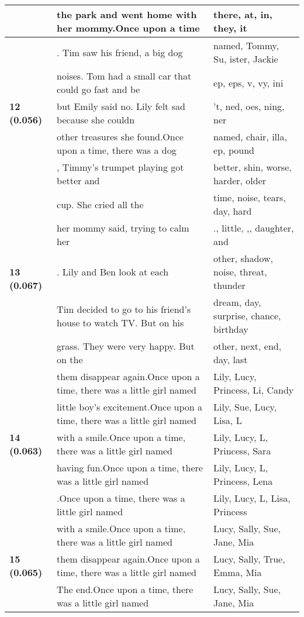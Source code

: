 \documentclass{article}
\begin{document}
\begin{adjustbox}{max width=\textwidth}
\begin{tabular}{p{} p{} p{}}
 & the park and went home with her mommy.Once upon a time & there,  at,  in,  they,  it \\
\midrule
\multirow{5}{*}{\textbf{12 (0.056)}} & . Tim saw his friend, a big dog & named,  Tommy,  Su, ister,  Jackie \\
 & noises. Tom had a small car that could go fast and be & ep, eps, v, vy, ini \\
 & but Emily said no. Lily felt sad because she couldn & 't, ned, oes, ning, ner \\
 & other treasures she found.Once upon a time, there was a dog & named, chair, illa, ep,  pound \\
 & , Timmy's trumpet playing got better and & better,  shin,  worse,  harder,  older \\
\midrule
\multirow{5}{*}{\textbf{13 (0.067)}} & cup. She cried all the & time,  noise,  tears,  day,  hard \\
 & her mommy said, trying to calm her & .,  little, ,,  daughter,  and \\
 & .  Lily and Ben look at each & other,  shadow,  noise,  threat,  thunder \\
 & Tim decided to go to his friend's house to watch TV. But on his & dream,  day,  surprise,  chance,  birthday \\
 & grass. They were very happy.  But on the & other,  next,  end,  day,  last \\
\midrule
\multirow{5}{*}{\textbf{14 (0.063)}} & them disappear again.Once upon a time, there was a little girl named & Lily,  Lucy,  Princess,  Li,  Candy \\
 & little boy's excitement.Once upon a time, there was a little girl named & Lily,  Sue,  Lucy,  Lisa,  L \\
 & with a smile.Once upon a time, there was a little girl named & Lily,  Lucy,  L,  Princess,  Sara \\
 & having fun.Once upon a time, there was a little girl named & Lily,  Lucy,  L,  Princess,  Lena \\
 & .Once upon a time, there was a little girl named & Lily,  Lucy,  L,  Lisa,  Princess \\
\midrule
\multirow{5}{*}{\textbf{15 (0.065)}} & with a smile.Once upon a time, there was a little girl named & Lucy,  Sally,  Sue,  Jane,  Mia \\
 & them disappear again.Once upon a time, there was a little girl named & Lucy,  Sally,  True,  Emma,  Mia \\
 & The end.Once upon a time, there was a little girl named & Lucy,  Sally,  Sue,  Jane,  Mia \\

\end{tabular}
\end{adjustbox}
\end{document}
